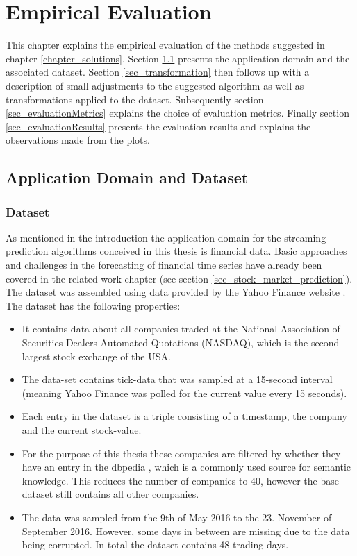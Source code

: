 \chapter{Empirical Evaluation}
\label{chapter_evaluation}

\ifpdf
    \graphicspath{{Chapter6/Figs/Raster/}{Chapter6/Figs/PDF/}{Chapter6/Figs/}}
\else
    \graphicspath{{Chapter6/Figs/Vector/}{Chapter6/Figs/}}
\fi

This chapter explains the empirical evaluation of the methods suggested in chapter \ref{chapter_solutions}. Section \ref{sec_applicationDomain} presents the application domain and the associated dataset. Section \ref{sec_transformation} then follows up with a description of small adjustments to the suggested algorithm as well as transformations applied to the dataset. Subsequently section \ref{sec_evaluationMetrics} explains the choice of evaluation metrics. Finally section \ref{sec_evaluationResults} presents the evaluation results and explains the observations made from the plots.

\section{Application Domain and Dataset}
\label{sec_applicationDomain}

\subsection{Dataset}
As mentioned in the introduction the application domain for the streaming prediction algorithms conceived in this thesis is financial data. Basic approaches and challenges in the forecasting of financial time series have already been covered in the related work chapter (see section \ref{sec_stock_market_prediction}). The dataset was assembled using data provided by the Yahoo Finance website \cite{yahooFinance}. The dataset has the following properties:
\begin{itemize}
	\item It contains data about all companies traded at the National Association of Securities Dealers Automated Quotations (NASDAQ), which is the second largest stock exchange of the USA.
	\item The data-set contains tick-data that was sampled at a 15-second interval (meaning Yahoo Finance was polled for the current value every 15 seconds).
	\item Each entry in the dataset is a triple consisting of a timestamp, the company and the current stock-value.
	\item For the purpose of this thesis these companies are filtered by whether they have an entry in the dbpedia \cite{auer2007dbpedia}, which is a commonly used source for semantic knowledge. This reduces the number of companies to 40, however the base dataset still contains all other companies.
	\item The data was sampled from the 9th of May 2016 to the 23. November of September 2016. However, some days in between are missing due to the data being corrupted. In total the dataset contains 48 trading days.
\end{itemize}

